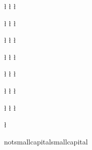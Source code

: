 \ifx\l\english
\newcommand{\class}{\mathrm{CLASS}}
\fi
\ifx\l\german
\newcommand{\class}{\mathrm{KLASSE}}
\fi		    
\ifx\l\french	    
\newcommand{\class}{\mathrm{CLASSE}}
\fi

\ifx\l\english
\newcommand{\close}{\phi}
\fi
\ifx\l\german
\newcommand{\close}{\phi}
\fi
\ifx\l\french
\newcommand{\close}{\phi}
\fi

\ifx\l\english
\newcommand{\comp}[1]{{#1}^c}
\fi
\ifx\l\german
\newcommand{\comp}[1]{{#1}^c}
\fi
\ifx\l\french
\newcommand{\comp}[1]{{#1}^c}
\fi


\newcommand{\compop}{\complement}

\newcommand{\compopf}{\complement}




\ifx\l\english
\newcommand{\ch}{\mathrm{CH}}
\fi
\ifx\l\german
\newcommand{\ch}{\mathrm{KH}}
\fi
\ifx\l\french
\newcommand{\ch}{\mathrm{EC}}
\fi

\newcommand{\condopen}[2]{\tilde{\open}_{#2}{(#1)}}
\newcommand{\condopenop}{\tilde{\open}}
\newcommand{\condopendef}{\tilde{\gamma}}


\ifx\l\english
\newcommand{\condclosedef}{\tilde{\phi}}
\fi
\ifx\l\german
\newcommand{\condclosedef}{\tilde{\phi}}
\fi
\ifx\l\french
\newcommand{\condclosedef}{\tilde{\phi}}
\fi

\ifx\l\english
\newcommand{\covariance}{K}
\fi
\ifx\l\german
\newcommand{\covariance}{K}
\fi
\ifx\l\french
\newcommand{\covariance}{K}
\fi

\ifx\l\english
\newcommand{\crs}{\mathrm{CS}} %
\fi
\ifx\l\german
\newcommand{\crs}{\mathrm{QS}} %
\fi
\ifx\l\french
\newcommand{\crs}{\mathrm{CS}} %
\fi


\ifx\l\english
\newcommand{\abbrv}{\normalsize}


\def\abbrv{notsmallcapital}
\def\smallcapital{smallcapital}

\ifx\abbrv\smallcapital
\newcommand{\CSIRO}{{\sc csiro}}
\newcommand{\CWI}{{\sc cwi}}
\newcommand{\JRC}{{\sc jrc}}
\newcommand{\SPIE}{{\sc spie}}
\newcommand{\SRI}{{\sc sri}}
\newcommand{\MM}{{\sc mm}}
\newcommand{\Mm}{{\sc Mm}}
\newcommand{\DEM}{{\sc dem}}
\newcommand{\AVHRR}{{\sc avhrr}}
\newcommand{\ISODATA}{{\sc isodata}}
\newcommand{\SAR}{{\sc sar}}
\newcommand{\HSI}{{\sc hsi}}
\newcommand{\RGB}{{\sc rgb}}
\newcommand{\FIFO}{{\sc fifo}}
\newcommand{\ASIC}{{\sc asic}}
\newcommand{\IKONOS}{{\sc ikonos}}
\newcommand{\NASA}{{\sc nasa}}
\newcommand{\SPOT}{{\sc spot}}
\newcommand{\SPOTP}{{\sc spot-p}}
\newcommand{\TM}{{\sc tm}}
\newcommand{\CNESSPOT}{{\sc cnes-spot}}
\newcommand{\CMO}{{\sc cmo}}
\newcommand{\MIDAS}{{\sc midas}}
\else

